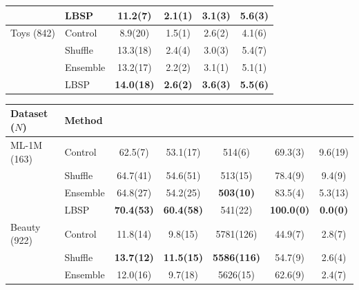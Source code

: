 \begin{table}[!htbp]
\begin{tabular*}{\textwidth}{@{\extracolsep{\fill}}llS[table-format=2.1(3)]S[table-format=2.1(3)]S[table-format=2.1(3)]S[table-format=2.1(3)]@{}}
 & LBSP & 11.2(7) & 2.1(1) & 3.1(3) & 5.6(3)\\ %
\midrule
Toys (842) & Control & 8.9(20) & 1.5(1) & 2.6(2) & 4.1(6)\\ %
 & Shuffle & 13.3(18) & 2.4(4) & 3.0(3) & 5.4(7)\\ %
 & Ensemble & 13.2(17) & 2.2(2) & 3.1(1) & 5.1(1)\\ %
 & LBSP & \bfseries 14.0(18) & \bfseries 2.6(2) & \bfseries 3.6(3) & \bfseries 5.5(6)\\ %
\bottomrule
\end{tabular*}
\par\smallskip\noindent{}\par\smallskip
\noindent\begin{tabular*}{\textwidth}{@{\extracolsep{\fill}}llS[table-format=2.1(3)]S[table-format=2.1(3)]S[table-format=5.0(3),table-align-uncertainty=false]S[table-format=3.1(3)]S[table-format=2.1(3)]@{}}
\toprule
{Dataset ($N$)} & Method & {} & {} & {} & {} & {}\\
\midrule
ML-1M (163) & Control & 62.5(7) & 53.1(17) & 514(6) & 69.3(3) & 9.6(19)\\ %
 & Shuffle & 64.7(41) & 54.6(51) & 513(15) & 78.4(9) & 9.4(9)\\ %
 & Ensemble & 64.8(27) & 54.2(25) & \bfseries 503(10) & 83.5(4) & 5.3(13)\\ %
 & LBSP & \bfseries 70.4(53) & \bfseries 60.4(58) & 541(22) & \bfseries 100.0(0) & \bfseries 0.0(0)\\ %
\midrule
Beauty (922) & Control & 11.8(14) & 9.8(15) & 5781(126) & 44.9(7) & 2.8(7)\\ %
 & Shuffle & \bfseries 13.7(12) & \bfseries 11.5(15) & \bfseries 5586(116) & 54.7(9) & 2.6(4)\\ %
 & Ensemble & 12.0(16) & 9.7(18) & 5626(15) & 62.6(9) & 2.4(7)\\ %

\end{tabular*}
\end{table}
